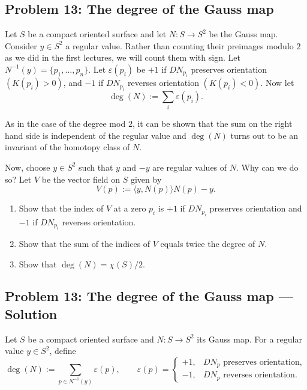 \documentclass[12pt,a4paper]{article}
\theoremstyle{plain}
\theoremstyle{definition}      %
\begin{document}
\subsection*{Problem 13: The degree of the Gauss map}

Let $S$ be a compact oriented surface and let $N:S\to S^{2}$ be the Gauss map.
Consider $y\in S^{2}$ a regular value. Rather than counting their preimages modulo $2$
as we did in the first lectures, we will count them with sign.
Let $N^{-1}(y)=\{p_{1},\dots,p_{n}\}$.
Let $\varepsilon(p_i)$ be $+1$ if $DN_{p_i}$ preserves orientation $(K(p_i)>0)$,
and $-1$ if $DN_{p_i}$ reverses orientation $(K(p_i)<0)$.
Now let
\[
\deg(N):=\sum_i \varepsilon(p_i).
\]

As in the case of the degree mod $2$, it can be shown that the sum on the right hand side
is independent of the regular value and $\deg(N)$ turns out to be an invariant of the homotopy
class of $N$.

Now, choose $y\in S^{2}$ such that $y$ and $-y$ are regular values of $N$.
Why can we do so? Let $V$ be the vector field on $S$ given by
\[
V(p):=\langle y, N(p)\rangle N(p)-y.
\]

\begin{enumerate}
	\item Show that the index of $V$ at a zero $p_i$ is $+1$ if $DN_{p_i}$ preserves orientation
	and $-1$ if $DN_{p_i}$ reverses orientation.
	\item Show that the sum of the indices of $V$ equals twice the degree of $N$.
	\item Show that $\deg(N)=\chi(S)/2$.
\end{enumerate}

	
	
	

\subsection*{Problem 13: The degree of the Gauss map --- Solution}

Let $S$ be a compact oriented surface and $N\colon S\to S^{2}$ its Gauss map.
For a regular value $y\in S^{2}$, define
\[
\deg(N):=\sum_{p\in N^{-1}(y)} \varepsilon(p),
\qquad
\varepsilon(p)=
\begin{cases}
	+1,& DN_p \text{ preserves orientation},\\
	-1,& DN_p \text{ reverses orientation}.
\end{cases}
\]
\end{document}
